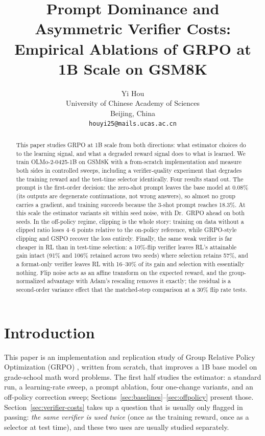 \documentclass{article}
\title{Prompt Dominance and Asymmetric Verifier Costs:\\[0.2ex] {\large Empirical Ablations of GRPO at 1B Scale on GSM8K}}
\author{%
  Yi Hou \\
  University of Chinese Academy of Sciences\\
  Beijing, China \\
  \texttt{houyi25@mails.ucas.ac.cn} \\
}
\begin{document}
\maketitle

\begin{abstract}
This paper studies GRPO at 1B scale from both directions: what estimator choices do to the learning signal, and what a degraded reward signal does to what is learned. We train OLMo-2-0425-1B on GSM8K with a from-scratch implementation and measure both sides in controlled sweeps, including a verifier-quality experiment that degrades the training reward and the test-time selector identically. Four results stand out. The prompt is the first-order decision: the zero-shot prompt leaves the base model at 0.08\% (its outputs are degenerate continuations, not wrong answers), so almost no group carries a gradient, and training succeeds because the 3-shot prompt reaches 18.3\%. At this scale the estimator variants sit within seed noise, with Dr.~GRPO ahead on both seeds. In the off-policy regime, clipping is the whole story: training on data without a clipped ratio loses 4--6 points relative to the on-policy reference, while GRPO-style clipping and GSPO recover the loss entirely. Finally, the same weak verifier is far cheaper in RL than in test-time selection: a 10\%-flip verifier leaves RL's attainable gain intact (91\% and 106\% retained across two seeds) where selection retains 57\%, and a format-only verifier leaves RL with 16--30\% of its gain and selection with essentially nothing. Flip noise acts as an affine transform on the expected reward, and the group-normalized advantage with Adam's rescaling removes it exactly; the residual is a second-order variance effect that the matched-step comparison at a 30\% flip rate tests.
\end{abstract}

\section{Introduction}
\label{sec:intro}

This paper is an implementation and replication study of Group Relative Policy Optimization (GRPO) \citep{shao2024deepseekmath}, written from scratch, that improves a 1B base model on grade-school math word problems. The first half studies the estimator: a standard run, a learning-rate sweep, a prompt ablation, four one-change variants, and an off-policy correction sweep; Sections~\ref{sec:baselines}--\ref{sec:offpolicy} present those. Section~\ref{sec:verifier-costs} takes up a question that is usually only flagged in passing: \emph{the same verifier is used twice} (once as the training reward, once as a selector at test time), and these two uses are usually studied separately.
\end{document}
